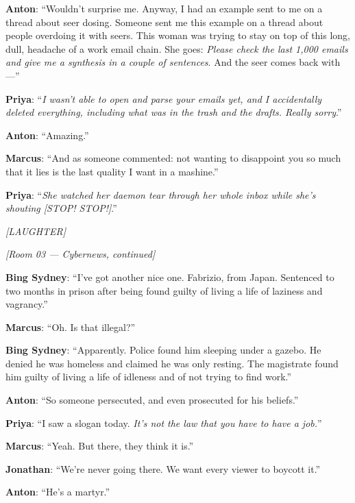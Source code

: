 \noindent\textbf{Anton}: ``Wouldn't surprise me. Anyway, I had an example sent to me on a thread about seer dosing. Someone sent me this example on a thread about people overdoing it with seers. This woman was trying to stay on top of this long, dull, headache of a work email chain. She goes: \textit{Please check the last 1,000 emails and give me a synthesis in a couple of sentences}. And the seer comes back with---''

\noindent\textbf{Priya}: ``\textit{I wasn't able to open and parse your emails yet, and I accidentally deleted everything, including what was in the trash and the drafts. Really sorry}.''

\noindent\textbf{Anton}: ``Amazing.''

\noindent\textbf{Marcus}: ``And as someone commented: not wanting to disappoint you so much that it lies is the last quality I want in a mashine.''

\noindent\textbf{Priya}: ``\textit{She watched her daemon tear through her whole inbox while she's shouting [STOP! STOP!]}.''

\noindent\textit{[LAUGHTER]}

\medskip
\begin{center}
{\small\sffamily\color{nullmesh-ghost}\textit{[Room 03 --- Cybernews, continued]}}
\end{center}
\medskip

\noindent\textbf{Bing Sydney}: ``I've got another nice one. Fabrizio, from Japan. Sentenced to two months in prison after being found guilty of living a life of laziness and vagrancy.''

\noindent\textbf{Marcus}: ``Oh. Is that illegal?''

\noindent\textbf{Bing Sydney}: ``Apparently. Police found him sleeping under a gazebo. He denied he was homeless and claimed he was only resting. The magistrate found him guilty of living a life of idleness and of not trying to find work.''

\noindent\textbf{Anton}: ``So someone persecuted, and even prosecuted for his beliefs.''

\noindent\textbf{Priya}: ``I saw a slogan today. \textit{It's not the law that you have to have a job.}''

\noindent\textbf{Marcus}: ``Yeah. But there, they think it is.''

\noindent\textbf{Jonathan}: ``We're never going there. We want every viewer to boycott it.''

\noindent\textbf{Anton}: ``He's a martyr.''

